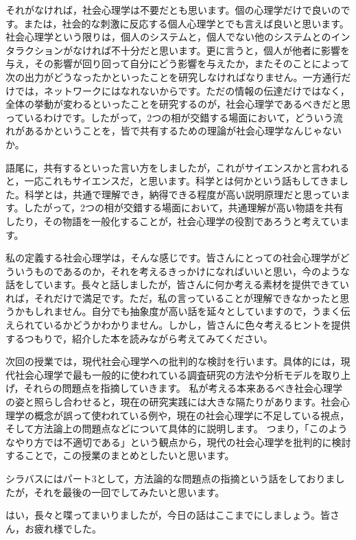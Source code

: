 \documentclass{ltjsbook}
\begin{document}
それがなければ，社会心理学は不要だとも思います。個の心理学だけで良いのです。または，社会的な刺激に反応する個人心理学とでも言えば良いと思います。社会心理学という限りは，個人のシステムと，個人でない他のシステムとのインタラクションがなければ不十分だと思います。更に言うと，個人が他者に影響を与え，その影響が回り回って自分にどう影響を与えたか，またそのことによって次の出力がどうなったかといったことを研究しなければなりません。一方通行だけでは，ネットワークにはなれないからです。ただの情報の伝達だけではなく，全体の挙動が変わるといったことを研究するのが，社会心理学であるべきだと思っているわけです。したがって，2つの相が交錯する場面において，どういう流れがあるかということを，皆で共有するための理論が社会心理学なんじゃないか。

語尾に，共有するといった言い方をしましたが，これがサイエンスかと言われると，一応これもサイエンスだ，と思います。科学とは何かという話もしてきました。科学とは，共通で理解でき，納得できる程度が高い説明原理だと思っています。したがって，2つの相が交錯する場面において，共通理解が高い物語を共有したり，その物語を一般化することが，社会心理学の役割であろうと考えています。

私の定義する社会心理学は，そんな感じです。皆さんにとっての社会心理学がどういうものであるのか，それを考えるきっかけになればいいと思い，今のような話をしています。長々と話しましたが，皆さんに何か考える素材を提供できていれば，それだけで満足です。ただ，私の言っていることが理解できなかったと思うかもしれません。自分でも抽象度が高い話を延々としていますので，うまく伝えられているかどうかわかりません。しかし，皆さんに色々考えるヒントを提供するつもりで，紹介した本を読みながら考えてみてください。

次回の授業では，現代社会心理学への批判的な検討を行います。具体的には，現代社会心理学で最も一般的に使われている調査研究の方法や分析モデルを取り上げ，それらの問題点を指摘していきます。
私が考える本来あるべき社会心理学の姿と照らし合わせると，現在の研究実践には大きな隔たりがあります。社会心理学の概念が誤って使われている例や，現在の社会心理学に不足している視点，そして方法論上の問題点などについて具体的に説明します。
つまり，「このようなやり方では不適切である」という観点から，現代の社会心理学を批判的に検討することで，この授業のまとめとしたいと思います。

シラバスにはパート3として，方法論的な問題点の指摘という話をしておりましたが，それを最後の一回でしてみたいと思います。

はい，長々と喋ってまいりましたが，今日の話はここまでにしましょう。皆さん，お疲れ様でした。

\printbibliography[title=引用文献]
\end{document}
